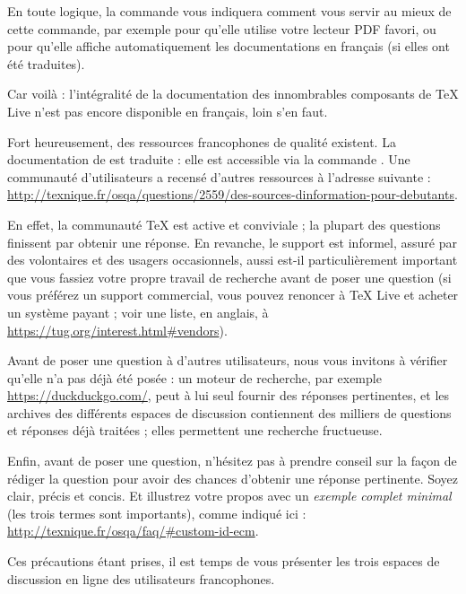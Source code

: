 \documentclass[german, english, french]{article}
\renewcommand{\TL}{\TeX{} Live\xspace}%
\begin{document}
En toute logique, la commande  vous indiquera comment vous
servir au mieux de cette commande, par exemple pour qu'elle utilise votre
lecteur PDF favori, ou pour qu'elle affiche automatiquement les documentations
en français (si elles ont été traduites).

Car voilà : l'intégralité de la documentation des innombrables composants de
\TL{} n'est pas encore disponible en français, loin s'en faut.

Fort heureusement, des ressources francophones de qualité existent.  La
documentation de \LaTeXe{} est traduite : elle est accessible via la commande
. Une communauté d'utilisateurs a recensé d'autres
ressources à l'adresse suivante :
\url{http://texnique.fr/osqa/questions/2559/des-sources-dinformation-pour-debutants}.

En effet, la communauté \TeX{} est active et conviviale ; la plupart des
questions finissent par obtenir une réponse. En revanche, le support est
informel, assuré par des volontaires et des usagers occasionnels, aussi est-il
particulièrement important que vous fassiez votre propre travail de recherche
avant de poser une question (si vous préférez un support commercial, vous pouvez
renoncer à \TL{} et acheter un système payant ; voir une liste, en anglais,
à \url{https://tug.org/interest.html#vendors}).

Avant de poser une question à d'autres utilisateurs, nous vous invitons
à vérifier qu'elle n'a pas déjà été posée : un moteur de recherche, par exemple
\url{https://duckduckgo.com/}, peut à lui seul fournir des réponses pertinentes,
et les archives des différents espaces de discussion contiennent des milliers de
questions et réponses déjà traitées ; elles permettent une recherche fructueuse.

Enfin, avant de poser une question, n'hésitez pas à prendre conseil sur la façon
de rédiger la question pour avoir des chances d'obtenir une réponse pertinente.
Soyez clair, précis et concis. Et illustrez votre propos avec un \emph{exemple
  complet minimal} (les trois termes sont importants), comme indiqué ici :
\url{http://texnique.fr/osqa/faq/#custom-id-ecm}.

Ces précautions étant prises, il est temps de vous présenter les trois espaces
de discussion en ligne des utilisateurs francophones.
\end{document}
